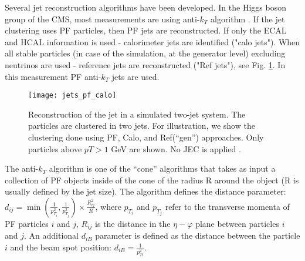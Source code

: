 Several jet reconstruction algorithms have been developed. In the Higgs boson group of the CMS, most measurements are using anti-$k_T$ algorithm \cite{antiKt}. If the jet clustering uses PF particles, then PF jets are reconstructed. If only the ECAL and HCAL information is used - calorimeter jets are identified ("calo jets"). When all stable particles (in case of the simulation, at the generator level) excluding neutrinos are used - reference jets are reconstructed ("Ref jets"), see Fig. \ref{jets_pf_calo}. In this measurement PF anti-$k_T$ jets are used. 





 \begin{figure}[H]
  \centering
  \texttt{[image: jets\_pf\_calo]}
  \caption[Reconstruction of the jet in a simulated two-jet system.]{Reconstruction of the jet in a simulated two-jet system. The particles are clustered in two jets. For illustration, we show the clustering done using PF, Calo, and Ref(``gen'') approaches. Only particles above $pT>1$ GeV are shown. No JEC is applied \cite{PFalgo}.}
  \label{jets_pf_calo}
\end{figure}




The anti-$k_T$ algorithm is one of the ``cone'' algorithms that takes as input a collection of PF objects inside of the cone of the radius R around the object (R is usually defined by the jet size). The algorithm defines the distance parameter:
$d_{ij} = \min (\frac{1}{p^2_{T_i}}, \frac{1}{p^2_{T_j}}) \times \frac{R^2_{ij}}{R}$, where $p_{T_i}$ and $p_{T_j}$ refer to the transverse momenta of PF particles $i$ and $j$, $R_{ij}$ is the distance in the $\eta - \varphi$ plane between particles $i$ and $j$. An additional $d_{iB}$ parameter is defined as the distance between the particle $i$ and the beam spot position: $d_{iB} = \frac{1}{p^2_{Ti} }$.

